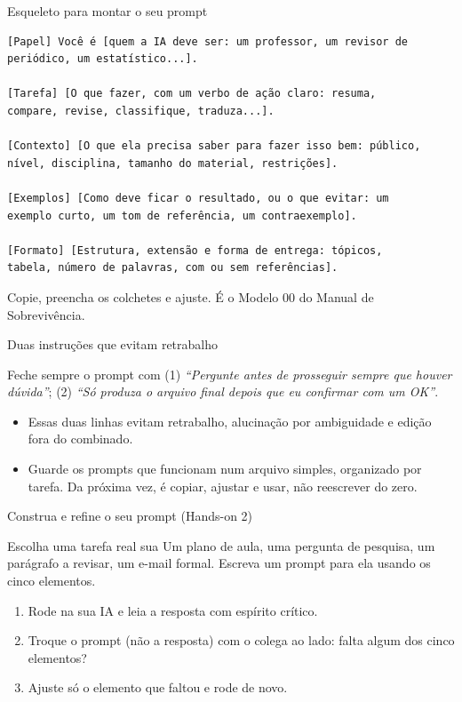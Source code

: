 \documentclass[11pt,aspectratio=169,t]{beamer}
\begin{document}
\begin{frame}[fragile]{Esqueleto para montar o seu prompt}
\begin{lstlisting}
[Papel] Você é [quem a IA deve ser: um professor, um revisor de
periódico, um estatístico...].

[Tarefa] [O que fazer, com um verbo de ação claro: resuma,
compare, revise, classifique, traduza...].

[Contexto] [O que ela precisa saber para fazer isso bem: público,
nível, disciplina, tamanho do material, restrições].

[Exemplos] [Como deve ficar o resultado, ou o que evitar: um
exemplo curto, um tom de referência, um contraexemplo].

[Formato] [Estrutura, extensão e forma de entrega: tópicos,
tabela, número de palavras, com ou sem referências].
\end{lstlisting}
\centering\small Copie, preencha os colchetes e ajuste. É o Modelo 00 do Manual de Sobrevivência.
\end{frame}

\begin{frame}{Duas instruções que evitam retrabalho}
  \begin{exampleblock}{Feche sempre o prompt com}
    \small
    (1) \textit{``Pergunte antes de prosseguir sempre que houver dúvida''}; (2) \textit{``Só produza o arquivo final depois que eu confirmar com um OK''}.
  \end{exampleblock}
  \pause
  \vfill
  \begin{itemize}
    \item Essas duas linhas evitam retrabalho, alucinação por ambiguidade e edição fora do combinado.
    \pause
    \item \alert{Guarde os prompts que funcionam} num arquivo simples, organizado por tarefa. Da próxima vez, é copiar, ajustar e usar, não reescrever do zero.
  \end{itemize}
\end{frame}

\begin{frame}{Construa e refine o seu prompt (Hands-on 2)}
  \begin{block}{Escolha uma tarefa real sua}
    Um plano de aula, uma pergunta de pesquisa, um parágrafo a revisar, um e-mail formal. Escreva um prompt para ela usando os cinco elementos.
  \end{block}
  \vfill
  \begin{enumerate}
    \item Rode na sua IA e leia a resposta com espírito crítico.
    \item Troque o prompt (não a resposta) com o colega ao lado: falta algum dos cinco elementos?
    \item Ajuste só o elemento que faltou e rode de novo.
  \end{enumerate}
\end{frame}
\end{document}
